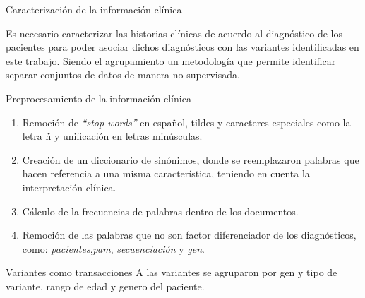 \documentclass[xcolor=dvipsnames]{beamer}
\begin{document}
\begin{frame}{Caracterización de la información clínica}
\begin{block}{}
\justifying
	{\justifying Es necesario caracterizar las historias clínicas de acuerdo al diagnóstico de los pacientes para poder asociar dichos diagnósticos con las variantes identificadas en este trabajo. Siendo el agrupamiento un metodología que permite identificar separar conjuntos de datos de manera no supervisada.
	}
\end{block}
\end{frame}

\begin{frame}{Preprocesamiento de la información clínica}
   	\begin{enumerate}[1.]
   	
		\justifying 
		\item Remoción de \textit{``stop words''} en español, tildes y caracteres especiales como la letra ñ y  unificación en letras minúsculas.
		\item Creación de un diccionario de sinónimos, donde se reemplazaron palabras que hacen referencia a una misma característica, teniendo en cuenta la interpretación clínica.
		\item Cálculo de la frecuencias de palabras dentro de los documentos. 
		\item Remoción de las palabras que no son factor diferenciador de los diagnósticos, como: \textit{pacientes},\textit{pam}, \textit{secuenciación} y \textit{gen}.  
	   	\end{enumerate}

\end{frame}

\begin{frame}{Variantes como transacciones}
\justifying 
A las variantes se agruparon por gen y tipo de variante, rango de edad y genero del paciente.
    \begin{table}[H]
	\centering
\caption{Items y transacciones}
\label{tabla:items}
\end{table}

\end{frame}
\end{document}
